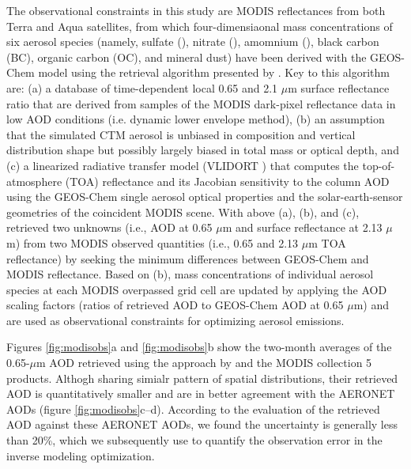  The observational constraints in this study are  MODIS reflectances from 
both Terra and Aqua satellites, from which four-dimensiaonal mass 
concentrations of six aerosol species (namely, sulfate (), nitrate 
(), amomnium (), black carbon (BC),  organic carbon (OC), 
and mineral dust) have been derived with the GEOS-Chem model using the 
retrieval algorithm presented by \citet{Wang10}.  Key to this algorithm are: 
(a) a database of time-dependent local 0.65 and 2.1 $\mu$m surface 
reflectance ratio that are derived from samples of the MODIS dark-pixel 
reflectance data in low AOD conditions (i.e. dynamic lower envelope method), 
(b) an assumption that the simulated CTM aerosol is unbiased  in composition
and vertical distribution shape but possibly largely biased in total mass or 
optical depth, and (c) a linearized radiative transfer model 
(VLIDORT \citep{Spurr06}) that computes the top-of-atmosphere (TOA) 
reflectance  and its Jacobian sensitivity to the column AOD using the 
GEOS-Chem single aerosol optical properties and the solar-earth-sensor 
geometries of the coincident MODIS scene. With above (a), (b), and (c), 
\citet{Wang10} retrieved two unknowns (i.e., AOD at 0.65 $\mu$m and surface
reflectance at 2.13 $\mu$m) from two MODIS observed quantities (i.e., 0.65 
and 2.13 $\mu$m TOA reflectance) by seeking the minimum differences between 
GEOS-Chem and MODIS reflectance. Based on (b), mass concentrations of 
individual aerosol species  at each MODIS overpassed grid cell are updated by
applying the AOD scaling factors (ratios of retrieved AOD to GEOS-Chem AOD at
0.65 $\mu$m) and are used as observational constraints for optimizing aerosol
emissions. 

 Figures \ref{fig:modisobs}a and \ref{fig:modisobs}b show the two-month 
averages of the 0.65-$\mu$m AOD retrieved using the approach by \citet{Wang10}
and the MODIS collection 5 products. Althogh sharing simialr pattern of 
spatial distributions, their retrieved AOD is quantitatively smaller and are 
in better agreement with the AERONET AODs (figure \ref{fig:modisobs}c--d). 
According to the evaluation of the retrieved AOD against these AERONET AODs, 
we found the uncertainty is generally less than 20\%, which we subsequently 
use to quantify the observation error in the inverse modeling optimization. 

